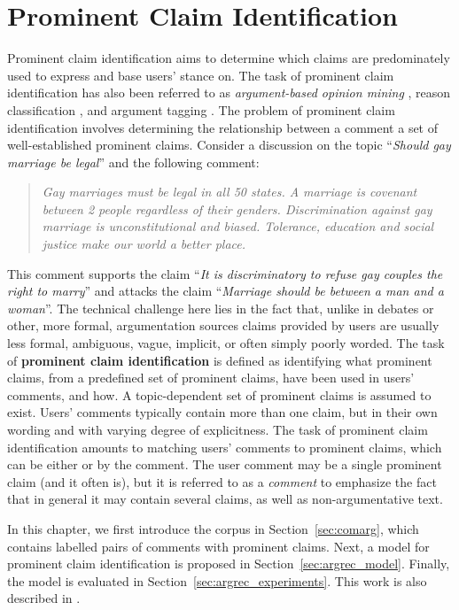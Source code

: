 \chapter{Prominent Claim Identification}
\label{chap:argrec}

Prominent claim identification aims to determine which claims are predominately
used to express and base users' stance on. The task of prominent claim
identification has also been referred to as \textit{argument-based opinion mining}
\citep{boltuzic2014back}, reason classification \citep{hasan2014you}, and
argument tagging \citep{sobhani2015argumentation}. 
The problem of prominent claim identification involves determining
the relationship between a comment a set of well-established prominent claims. 
Consider a discussion on the topic ``\emph{Should gay marriage be legal}''
and the following comment: 
\begin{quote}
\emph{
Gay marriages must be legal in all 50 states. A marriage is covenant
between 2 people regardless of their genders. Discrimination against
gay marriage is unconstitutional and biased. Tolerance, education and
social justice make our world a better place.
}
\end{quote}
This comment supports the claim ``\emph{It is discriminatory to refuse
gay couples the right to marry}'' and attacks the claim
``\emph{Marriage should be between a man and a woman}''. 
The technical challenge here lies in the fact that, unlike
in debates or other, more formal, argumentation sources
claims provided by users are usually less formal, ambiguous, vague, 
implicit, or often simply poorly worded. 
The task of \textbf{prominent claim identification} is defined 
as identifying what prominent claims, from a predefined set of prominent claims, 
have been used in users' comments, and how. 
A topic-dependent set of prominent claims is assumed to exist. 
Users' comments typically contain more than one claim, but in their 
own wording and with varying degree of explicitness. 
The task of prominent claim identification amounts to matching
users' comments to prominent claims, which can be either  or 
 by the comment. 
The user comment may be a single prominent claim (and it often is), but it 
is referred to as a \textit{comment} to emphasize the fact that in general 
it may contain several claims, as well as non-argumentative text. 

In this chapter, we first introduce the \ComArg corpus in Section~\ref{sec:comarg},
which contains labelled pairs of comments with prominent claims. Next, 
a model for prominent claim identification is proposed in 
Section~\ref{sec:argrec_model}. Finally, the model is evaluated in 
Section~\ref{sec:argrec_experiments}. 
This work is also described in \citep{boltuzic2014back}.

